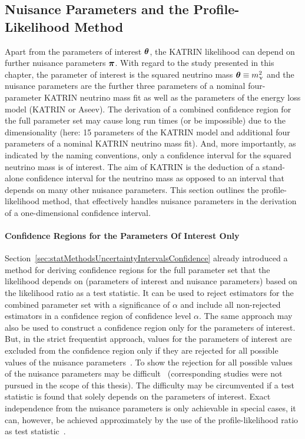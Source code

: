\subsection{Nuisance Parameters and the Profile-Likelihood Method}
\label{sec:katrinElossStatisticsProfileLikelihood}
Apart from the parameters of interest $\boldsymbol{\mathbf{\theta}}$, the KATRIN likelihood can depend on further nuisance parameters $\boldsymbol{\mathbf{\pi}}$. With regard to the study presented in this chapter, the parameter of interest is the squared neutrino mass $\boldsymbol{\mathbf{\theta}}\equiv m_\upnu^2$ and the nuisance parameters are the further three parameters of a nominal four-parameter KATRIN neutrino mass fit as well as the parameters of the energy loss model (KATRIN or Aseev). The derivation of a combined confidence region for the full parameter set may cause long run times (or be impossible) due to the dimensionality (here: 15 parameters of the KATRIN model and additional four parameters of a nominal KATRIN neutrino mass fit). And, more importantly, as indicated by the naming conventions, only a confidence interval for the squared neutrino mass is of interest. The aim of KATRIN is the deduction of a stand-alone confidence interval for the neutrino mass as opposed to an interval that depends on many other nuisance parameters. This section outlines the profile-likelihood method, that effectively handles nuisance parameters in the derivation of a one-dimensional confidence interval.

\paragraph{Confidence Regions for the Parameters Of Interest Only}
Section~\ref{sec:statMethodsUncertaintyIntervalsConfidence} already introduced a method for deriving confidence regions for the full parameter set that the likelihood depends on (parameters of interest and nuisance parameters) based on the likelihood ratio as a test statistic. It can be used to reject estimators for the combined parameter set with a significance of $\alpha$ and include all non-rejected estimators in a confidence region of confidence level $\alpha$. The same approach may also be used to construct a confidence region only for the parameters of interest. But, in the strict frequentist approach, values for the parameters of interest are excluded from the confidence region only if they are rejected for all possible values of the nuisance parameters~\cite{ReviewOfParticlePhysics}. To show the rejection for all possible values of the nuisance parameters may be difficult~\cite{ReviewOfParticlePhysics} (corresponding studies were not pursued in the scope of this thesis). The difficulty may be circumvented if a test statistic is found that solely depends on the parameters of interest. Exact independence from the nuisance parameters is only achievable in special cases, it can, however, be achieved approximately by the use of the profile-likelihood ratio as test statistic~\cite{ReviewOfParticlePhysics}.

